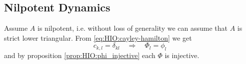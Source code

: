 \clearpage
\subsection{Nilpotent Dynamics}
	Assume $A$ is nilpotent, i.e. without loss of generality we can assume that $A$ is 
	strict lower triangular. From \eqref{eq:HIO:cayley-hamilton} we get 
	\begin{equation}
	c_{k,l} = \delta_{kl} \quad \Rightarrow \quad  \Phi_l = \phi_l 
	\end{equation}
	and by proposition \ref{prop:HIO:phi_injective} each $\Phi$ is injective. 
	

%
%
%
%
